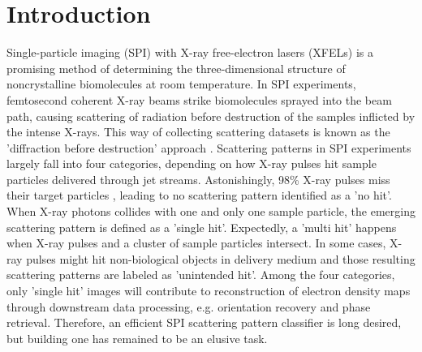 \section{Introduction}


Single-particle imaging (SPI) with X-ray free-electron lasers (XFELs) is a
promising method of determining the three-dimensional structure of
noncrystalline biomolecules at room temperature.   In SPI experiments,
femtosecond coherent X-ray beams strike biomolecules sprayed into the beam path,
causing scattering of radiation before destruction of the samples inflicted by
the intense X-rays.  This way of collecting scattering datasets is known as the
'diffraction before destruction' approach
\cite{neutzePotentialBiomolecularImaging2000,
chapmanFemtosecondDiffractiveImaging2006,seibertSingleMimivirusParticles2011,
aquilaLinacCoherentLight2015,reddyCoherentSoftXray2017}.  Scattering patterns in
SPI experiments largely fall into four categories, depending on how X-ray pulses
hit sample particles delivered through jet streams.  Astonishingly, 98\% X-ray
pulses miss their target particles
\cite{shiEvaluationPerformanceClassification2019}, leading to no scattering
pattern identified as a 'no hit'.  When X-ray photons collides with one and only
one sample particle, the emerging scattering pattern is defined as a 'single
hit'. Expectedly, a 'multi hit' happens when X-ray pulses and a cluster of
sample particles intersect. In some cases, X-ray pulses might hit non-biological
objects in delivery medium and those resulting scattering patterns are labeled
as 'unintended hit'.  Among the four categories, only 'single hit' images will
contribute to reconstruction of electron density maps through downstream data
processing, e.g. orientation recovery and phase retrieval.  Therefore, an
efficient SPI scattering pattern classifier is long desired, but building one
has remained to be an elusive task.


% 

